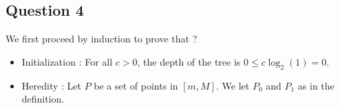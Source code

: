 \documentclass{cours}
\begin{document}
\subsection{Question 4}
We first proceed by induction to prove that ?
\begin{itemize}
    \item Initialization : For all $c > 0$, the depth of the tree is $0 \leq c\log_{2}(1) = 0$.
    \item Heredity : Let $P$ be a set of points in $\left[m, M\right]$. 
    We let $P_0$ and $P_{1}$ as in the definition. 


\end{itemize}
 
\end{document}
